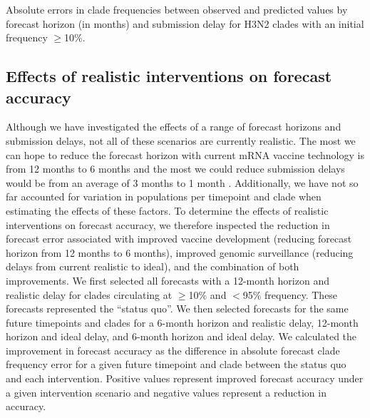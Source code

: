 \documentclass[9pt,lineno]{elife}
\begin{document}
\begin{table}[htb]
  \begin{center}
    
    \caption{Absolute errors in clade frequencies between observed and predicted values by forecast horizon (in months) and submission delay for H3N2 clades with an initial frequency $\geq$10\%.}
    \label{tab:h3n2_absolute_forecast_clade_frequency_errors}
  \end{center}
\end{table}

\subsection{Effects of realistic interventions on forecast accuracy}

Although we have investigated the effects of a range of forecast horizons and submission delays, not all of these scenarios are currently realistic.
The most we can hope to reduce the forecast horizon with current mRNA vaccine technology is from 12 months to 6 months and the most we could reduce submission delays would be from an average of 3 months to 1 month \citep{Grant2023}.
Additionally, we have not so far accounted for variation in populations per timepoint and clade when estimating the effects of these factors.
To determine the effects of realistic interventions on forecast accuracy, we therefore inspected the reduction in forecast error associated with improved vaccine development (reducing forecast horizon from 12 months to 6 months), improved genomic surveillance (reducing delays from current realistic to ideal), and the combination of both improvements.
We first selected all forecasts with a 12-month horizon and realistic delay for clades circulating at $\ge$10\% and $<$95\% frequency.
These forecasts represented the ``status quo''.
We then selected forecasts for the same future timepoints and clades for a 6-month horizon and realistic delay, 12-month horizon and ideal delay, and 6-month horizon and ideal delay.
We calculated the improvement in forecast accuracy as the difference in absolute forecast clade frequency error for a given future timepoint and clade between the status quo and each intervention.
Positive values represent improved forecast accuracy under a given intervention scenario and negative values represent a reduction in accuracy.
\end{document}
